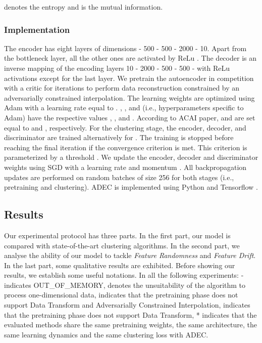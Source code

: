 \documentclass{article}
\begin{document}
 denotes the entropy and  is the mutual information.

\subsubsection{Implementation}
The encoder has eight layers of dimensions  - 500 - 500 - 2000 - 10. Apart from the bottleneck layer, all the other ones are activated by ReLu \cite{paper44}. The decoder is an inverse mapping of the encoding layers 10 - 2000 - 500 - 500 -  with ReLu activations except for the last layer. We pretrain the autoencoder in competition with a critic for  iterations to perform data reconstruction constrained by an adversarially constrained interpolation. The learning weights are optimized using Adam \cite{paper45} with a learning rate equal to . , , and  (i.e., hyperparameters specific to Adam) have the respective values , , and . According to ACAI \cite{paper5} paper,  and  are set equal to  and , respectively. For the clustering stage, the encoder, decoder, and discriminator are trained alternatively for . The training is stopped before reaching the final iteration if the convergence criterion is met. This criterion is parameterized by a threshold .  We update the encoder, decoder and discriminator weights using SGD with a learning rate  and momentum . All backpropagation updates are performed on random batches of size 256 for both stages (i.e., pretraining and clustering). ADEC is implemented using Python and Tensorflow \cite{paper46}.
 
\subsection{Results}
Our experimental protocol has  three parts. In the first part, our model is compared with state-of-the-art clustering algorithms. In the second part, we analyse the ability of our model to tackle \textit{Feature Randomness} and \textit{Feature Drift}. In the last part, some qualitative results are exhibited. Before showing our results, we establish some useful notations. In all the following experiments: {-} indicates OUT\_OF\_MEMORY,  denotes the unsuitability of the algorithm to process one-dimensional data,  indicates that the pretraining phase does not support Data Transform and Adversarially Constrained Interpolation,  indicates that the pretraining phase does not support Data Transform, * indicates that the evaluated methods share the same pretraining weights, the same architecture, the same learning dynamics and the same clustering loss with ADEC.
\end{document}
